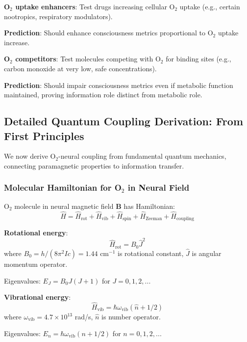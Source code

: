 \documentclass[11pt,onecolumn]{article}
\begin{document}
\textbf{O$_2$ uptake enhancers}: Test drugs increasing cellular O$_2$ uptake (e.g., certain nootropics, respiratory modulators).

\textbf{Prediction}: Should enhance consciousness metrics proportional to O$_2$ uptake increase.

\textbf{O$_2$ competitors}: Test molecules competing with O$_2$ for binding sites (e.g., carbon monoxide at very low, safe concentrations).

\textbf{Prediction}: Should impair consciousness metrics even if metabolic function maintained, proving information role distinct from metabolic role.

\subsection{Detailed Quantum Coupling Derivation: From First Principles}

We now derive O$_2$-neural coupling from fundamental quantum mechanics, connecting paramagnetic properties to information transfer.

\subsubsection{Molecular Hamiltonian for O$_2$ in Neural Field}

O$_2$ molecule in neural magnetic field $\mathbf{B}$ has Hamiltonian:
\begin{equation}
\hat{H} = \hat{H}_{\text{rot}} + \hat{H}_{\text{vib}} + \hat{H}_{\text{spin}} + \hat{H}_{\text{Zeeman}} + \hat{H}_{\text{coupling}}
\end{equation}

\textbf{Rotational energy}:
\begin{equation}
\hat{H}_{\text{rot}} = B_0 \hat{J}^2
\end{equation}
where $B_0 = h/(8\pi^2 I c) = 1.44$ cm$^{-1}$ is rotational constant, $\hat{J}$ is angular momentum operator.

Eigenvalues: $E_J = B_0 J(J+1)$ for $J = 0, 1, 2, ...$

\textbf{Vibrational energy}:
\begin{equation}
\hat{H}_{\text{vib}} = \hbar\omega_{\text{vib}}(\hat{n} + 1/2)
\end{equation}
where $\omega_{\text{vib}} = 4.7 \times 10^{13}$ rad/s, $\hat{n}$ is number operator.

Eigenvalues: $E_n = \hbar\omega_{\text{vib}}(n + 1/2)$ for $n = 0, 1, 2, ...$
\end{document}
